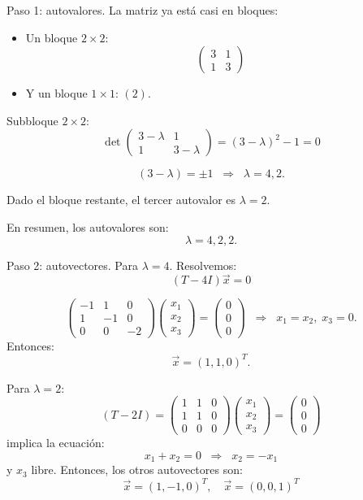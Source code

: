 \documentclass[11pt,spanish]{article}
\begin{document}
Paso 1: autovalores.
La matriz ya está casi en bloques:
\begin{itemize}
\item Un bloque $2\times 2$:
$$
 \begin{pmatrix}
3 & 1 \\
1 & 3
\end{pmatrix}
$$
\item Y un bloque $1\times 1$: $(2)$.
\end{itemize}

Subbloque $2\times2$:
$$
\det
\begin{pmatrix}
3-\lambda & 1 \\
1 & 3-\lambda
\end{pmatrix}
= (3-\lambda)^2 - 1 = 0
$$

$$
(3-\lambda) = \pm 1 \;\; \Rightarrow \;\; \lambda = 4,2.
$$

Dado el bloque restante, el tercer autovalor es $\lambda = 2$.

En resumen, los autovalores son:
$$
\boxed{\lambda = 4,2,2.}
$$

Paso 2: autovectores.
Para $\lambda = 4$.
Resolvemos:
$$
(T - 4I)\vec x = 0
$$

$$
\begin{pmatrix}
-1 & 1 & 0 \\
1 & -1 & 0 \\
0 & 0 & -2
\end{pmatrix}
\begin{pmatrix}x_1\\x_2\\x_3\end{pmatrix}
=
\begin{pmatrix}0\\0\\0\end{pmatrix}
\;\;
\Rightarrow 
\;\;
x_1 = x_2,\; x_3 = 0.
$$
Entonces:
$$
\vec x = (1,1,0)^T.
$$

Para $\lambda = 2$:
$$
(T - 2I) =
\begin{pmatrix}
1 & 1 & 0 \\
1 & 1 & 0 \\
0 & 0 & 0
\end{pmatrix}
\begin{pmatrix}x_1\\x_2\\x_3\end{pmatrix}
=
\begin{pmatrix}0\\0\\0\end{pmatrix}
$$
implica la ecuación:
$$
x_1 + x_2 = 0 \;\; \Rightarrow \;\; x_2 = -x_1
$$
y $x_3$ libre.
Entonces, los otros autovectores son:
$$
\vec x = (1,-1,0)^T, \quad \vec x = (0,0,1)^T
$$
\end{document}
